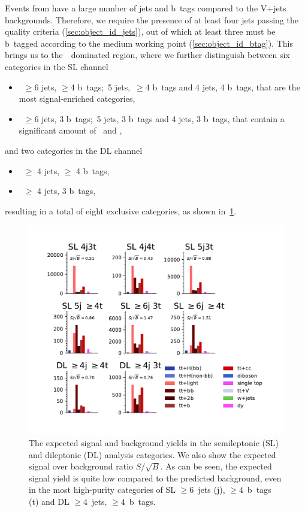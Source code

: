 Events from \ttHbb\xspace have a large number of jets and b~tags compared to the V+jets backgrounds. Therefore, we require the presence of at least four jets passing the quality criteria (\cref{sec:object_id_jets}), out of which at least three must be b~tagged according to the medium working point (\cref{sec:object_id_btag}). This brings us to the~\ttbar~dominated region, where we further distinguish between six categories in the SL channel
\begin{itemize}
\item~$\geq$6 jets, $\geq$4 b~tags;\ 5 jets,\ $\geq$4 b~tags and 4 jets, 4 b~tags, that are the most signal-enriched categories,
\item~$\geq$6 jets, 3 b~tags;\ 5 jets, 3 b~tags and 4 jets, 3 b~tags, that contain a significant amount of \ttcc~and \ttbb,
\end{itemize}
and two categories in the DL channel
\begin{itemize}
\item~$\geq$ 4 jets, $\geq$ 4 b~tags,
\item~$\geq$ 4 jets, 3 b~tags,
\end{itemize}
resulting in a total of eight exclusive categories, as shown in~\cref{fig:tth_pies}.

\begin{figure}
\begin{centering}
\includegraphics[width = 1.0\textwidth]{figures/tth/pies.pdf}
\caption[The expected signal and background yields in the analysis categories]{The expected signal and background yields in the semileptonic (SL) and dileptonic (DL) analysis categories. We also show the expected signal over background ratio $S / \sqrt{B}$. As can be seen, the expected signal yield is quite low compared to the predicted background, even in the most high-purity categories of SL $\geq6$~jets (j), $\geq4$~b~tags (t) and DL $\geq4$~jets, $\geq4$~b~tags.}
\label{fig:tth_pies}
\end{centering}
\end{figure}


